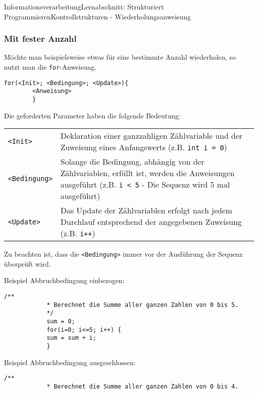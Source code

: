 \documentclass[11pt,oneside,openany,headings=optiontotoc,11pt,numbers=noenddot]{article}
\begin{document}
\begin{worksheet}{Informationsverarbeitung}{Lernabschnitt: Strukturiert Programmieren}{Kontrollstrukturen - Wiederholungsanweisung}
		\subsubsection{Mit fester Anzahl}
		Möchte man beispielsweise etwas für eine bestimmte Anzahl wiederholen, so nutzt man die \lstinline[style=JavaInputStyle]|for|-Anweisung.
		\begin{lstlisting}[style=JavaInputStyle]
		for(<Init>; <Bedingung>; <Update>){
		<Anweisung>
		}
		\end{lstlisting}
		\par\bigskip\noindent
		Die geforderten Parameter haben die folgende Bedeutung:\\
		\begin{tabularx}{\textwidth}{lX}
			{\lstinline[style=JavaInputStyle]|<Init>|} & Deklaration einer ganzzahligen Zählvariable und der Zuweisung eines Anfangswerts (z.B. {\lstinline[style=JavaInputStyle]|int i = 0|})\\
			{\lstinline[style=JavaInputStyle]|<Bedingung>|} & Solange die Bedingung, abhängig von der Zählvariablen, erfüllt ist, werden die Anweisungen ausgeführt (z.B. {\lstinline[style=JavaInputStyle]|i < 5|} - Die Sequenz wird 5 mal ausgeführt)\\
			{\lstinline[style=JavaInputStyle]|<Update>|} & Das Update der Zählvariablen erfolgt nach jedem Durchlauf entsprechend der angegebenen Zuweisung (z.B. {\lstinline[style=JavaInputStyle]|i++|})
		\end{tabularx}
		Zu beachten ist, dass die {\lstinline[style=JavaInputStyle]|<Bedingung>|} immer vor der Ausführung der Sequenz überprüft wird.\\
		\par\noindent
		\begin{minipage}[t]{0.48\textwidth}
			\vspace*{0pt}
			Beispiel Abbruchbedingung einbezogen:
			\begin{lstlisting}[style=JavaInputStyle,frame=single]
			/**
			* Berechnet die Summe aller ganzen Zahlen von 0 bis 5.
			*/
			sum = 0;
			for(i=0; i<=5; i++) {
			sum = sum + i;
			}
			\end{lstlisting}
		\end{minipage}
		\hfill
		\begin{minipage}[t]{0.48\textwidth}
			\vspace*{0pt}
			Beispiel Abbruchbedingung ausgeschlossen:
			\begin{lstlisting}[style=JavaInputStyle,frame=single]
			/**
			* Berechnet die Summe aller ganzen Zahlen von 0 bis 4.

\end{lstlisting}
\end{minipage}
\end{worksheet}
\end{document}
